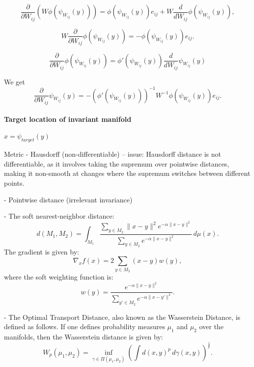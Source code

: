 \documentclass{article}
\theoremstyle{definition} \newtheorem{definition}{Definition}
\theoremstyle{remark} \newtheorem{remark}{Remark}
\newcounter{ct}
\begin{document}
\begin{equation}
\frac{\partial}{\partial W_{ij}} \left( W \phi(\psi_{W_{ij}}(y)) \right) = \phi(\psi_{W_{ij}}(y)) e_{ij} + W \frac{d}{dW_{ij}} \phi(\psi_{W_{ij}}(y)),
\end{equation}

\begin{equation}
W \frac{\partial}{\partial W_{ij}}  \phi(\psi_{W_{ij}}(y)) = - \phi(\psi_{W_{ij}}(y)) e_{ij}.
\end{equation}


\begin{equation}
\frac{\partial}{\partial W_{ij}}  \phi(\psi_{W_{ij}}(y)) = \phi'(\psi_{W_{ij}}(y))\frac{d}{dW_{ij}}\psi_{W_{ij}}(y)
\end{equation}

We get 
\begin{equation}
\frac{\partial}{\partial W_{ij}} \psi_{W_{ij}}(y) = - \left(\phi'(\psi_{W_{ij}}(y))\right)^{-1} W^{-1} \phi(\psi_{W_{ij}}(y)) e_{ij}.
\end{equation}



\paragraph{Target location of invariant manifold}
$x = \psi_{target}(y)$

Metric
- Hausdorff (non-differentiable)
-- issue: Hausdorff distance is not differentiable, as it involves taking the supremum over pointwise distances, making it non-smooth at changes where the supremum switches between different points.


- Pointwise distance (irrelevant invariance)

- The soft nearest-neighbor distance:
\[
d(M_1, M_2) = \int_{M_1} \frac{\sum\limits_{y \in M_2} \|x - y\|^2 e^{-\alpha \|x - y\|^2}}{\sum\limits_{y \in M_2} e^{-\alpha \|x - y\|^2}} \, d\mu(x).
\]
The gradient is given by:
\[
\nabla_x f(x) = 2 \sum_{y \in M_2} (x - y) w(y),
\]
where the soft weighting function is:
\[
w(y) = \frac{e^{-\alpha \|x - y\|^2}}{\sum\limits_{y' \in M_2} e^{-\alpha \|x - y'\|^2}}.
\]


- The Optimal Transport Distance, also known as the Wasserstein Distance, is defined as follows.
If one defines probability measures \( \mu_1 \) and \( \mu_2 \) over the manifolds, then the Wasserstein distance is given by:
\[
W_p(\mu_1, \mu_2) = \inf_{\gamma \in \Pi(\mu_1, \mu_2)} \left( \int d(x, y)^p \, d\gamma(x, y) \right)^{\frac{1}{p}}.
\]
\end{document}
